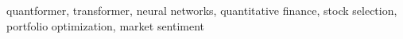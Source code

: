 \documentclass[preprint,12pt]{elsarticle}
\begin{document}
\begin{frontmatter}









\begin{keyword}
quantformer, transformer, neural networks, quantitative finance, stock selection, portfolio optimization, market sentiment


\end{keyword}

\end{frontmatter}


\end{document}
